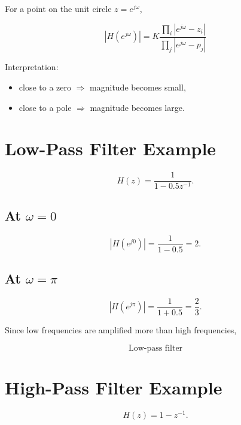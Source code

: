 For a point on the unit circle \(z=e^{j\omega}\),

\[
\boxed{
|H(e^{j\omega})|=
K
\frac{\prod_i |e^{j\omega}-z_i|}
{\prod_j |e^{j\omega}-p_j|}
}
\]

Interpretation:

\begin{itemize}
\item close to a zero \(\Rightarrow\) magnitude becomes small,
\item close to a pole \(\Rightarrow\) magnitude becomes large.
\end{itemize}


\section{Low-Pass Filter Example}

\[
H(z)=
\frac{1}{1-0.5z^{-1}}.
\]


\subsection{At \(\omega=0\)}

\[
|H(e^{j0})|=
\frac{1}{1-0.5}=2.
\]


\subsection{At \(\omega=\pi\)}

\[
|H(e^{j\pi})|=
\frac{1}{1+0.5}=\frac23.
\]

Since low frequencies are amplified more than high frequencies,

\[
\boxed{
\text{Low-pass filter}
}
\]


\section{High-Pass Filter Example}

\[
H(z)=1-z^{-1}.
\]


